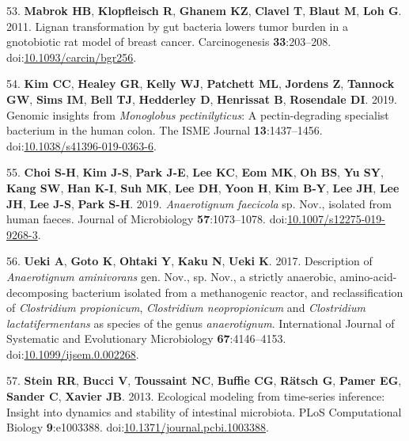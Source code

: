 \documentclass[
  12pt,
]{article}
\newenvironment{cslreferences}%
  {}%
  {\par}
\begin{document}
\begin{cslreferences}
\leavevmode\hypertarget{ref-Mabrok2011}{}%
53. \textbf{Mabrok HB}, \textbf{Klopfleisch R}, \textbf{Ghanem KZ},
\textbf{Clavel T}, \textbf{Blaut M}, \textbf{Loh G}. 2011. Lignan
transformation by gut bacteria lowers tumor burden in a gnotobiotic rat
model of breast cancer. Carcinogenesis \textbf{33}:203--208.
doi:\href{https://doi.org/10.1093/carcin/bgr256}{10.1093/carcin/bgr256}.

\leavevmode\hypertarget{ref-Kim2019}{}%
54. \textbf{Kim CC}, \textbf{Healey GR}, \textbf{Kelly WJ},
\textbf{Patchett ML}, \textbf{Jordens Z}, \textbf{Tannock GW},
\textbf{Sims IM}, \textbf{Bell TJ}, \textbf{Hedderley D},
\textbf{Henrissat B}, \textbf{Rosendale DI}. 2019. Genomic insights from
\emph{Monoglobus pectinilyticus}: A pectin-degrading specialist
bacterium in the human colon. The ISME Journal \textbf{13}:1437--1456.
doi:\href{https://doi.org/10.1038/s41396-019-0363-6}{10.1038/s41396-019-0363-6}.

\leavevmode\hypertarget{ref-Choi2019}{}%
55. \textbf{Choi S-H}, \textbf{Kim J-S}, \textbf{Park J-E}, \textbf{Lee
KC}, \textbf{Eom MK}, \textbf{Oh BS}, \textbf{Yu SY}, \textbf{Kang SW},
\textbf{Han K-I}, \textbf{Suh MK}, \textbf{Lee DH}, \textbf{Yoon H},
\textbf{Kim B-Y}, \textbf{Lee JH}, \textbf{Lee JH}, \textbf{Lee J-S},
\textbf{Park S-H}. 2019. \emph{Anaerotignum faecicola} sp. Nov.,
isolated from human faeces. Journal of Microbiology
\textbf{57}:1073--1078.
doi:\href{https://doi.org/10.1007/s12275-019-9268-3}{10.1007/s12275-019-9268-3}.

\leavevmode\hypertarget{ref-Ueki2017}{}%
56. \textbf{Ueki A}, \textbf{Goto K}, \textbf{Ohtaki Y}, \textbf{Kaku
N}, \textbf{Ueki K}. 2017. Description of \emph{Anaerotignum
aminivorans} gen. Nov., sp. Nov., a strictly anaerobic,
amino-acid-decomposing bacterium isolated from a methanogenic reactor,
and reclassification of \emph{Clostridium propionicum},
\emph{Clostridium neopropionicum} and \emph{Clostridium
lactatifermentans} as species of the genus \emph{anaerotignum}.
International Journal of Systematic and Evolutionary Microbiology
\textbf{67}:4146--4153.
doi:\href{https://doi.org/10.1099/ijsem.0.002268}{10.1099/ijsem.0.002268}.

\leavevmode\hypertarget{ref-Stein2013}{}%
57. \textbf{Stein RR}, \textbf{Bucci V}, \textbf{Toussaint NC},
\textbf{Buffie CG}, \textbf{Rätsch G}, \textbf{Pamer EG}, \textbf{Sander
C}, \textbf{Xavier JB}. 2013. Ecological modeling from time-series
inference: Insight into dynamics and stability of intestinal microbiota.
PLoS Computational Biology \textbf{9}:e1003388.
doi:\href{https://doi.org/10.1371/journal.pcbi.1003388}{10.1371/journal.pcbi.1003388}.


\end{cslreferences}
\end{document}
